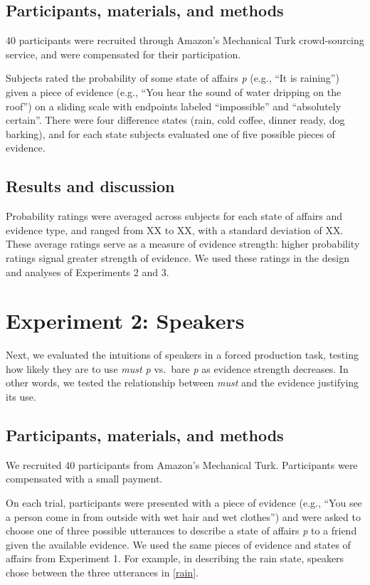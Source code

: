 \documentclass[10pt,letterpaper]{article}
\begin{document}
\subsection{Participants, materials, and methods}

40 participants were recruited through Amazon's Mechanical Turk crowd-sourcing service, and were compensated for their participation.

Subjects rated the probability of some state of affairs \emph{p} (e.g., ``It is raining'') given a piece of evidence (e.g., ``You hear the sound of water dripping on the roof'') on a sliding scale with endpoints labeled ``impossible'' and ``absolutely certain''. There were four difference states (rain, cold coffee, dinner ready, dog barking), and for each state subjects evaluated one of five possible pieces of evidence.

\subsection{Results and discussion}

Probability ratings were averaged across subjects for each state of affairs and evidence type, and ranged from XX to XX, with a standard deviation of XX. These average ratings serve as a measure of evidence strength: higher probability ratings signal greater strength of evidence. We used these ratings in the design and analyses of Experiments 2 and 3.

\section{Experiment 2: Speakers}

Next, we evaluated the intuitions of speakers in a forced production task, testing how likely they are to use \emph{must p} vs.~bare \emph{p} as evidence strength decreases. In other words, we tested the relationship between \emph{must} and the evidence justifying its use.

\subsection{Participants, materials, and methods}

We recruited 40 participants from Amazon's Mechanical Turk. Participants were compensated with a small payment.

On each trial, participants were presented with a piece of evidence (e.g., ``You see a person come in from outside with wet hair and wet clothes'') and were asked to choose one of three possible utterances to describe a state of affairs \emph{p} to a friend given the available evidence. We used the same pieces of evidence and states of affairs from Experiment 1. For example, in describing the rain state, speakers chose between the three utterances in \ref{rain}.
\end{document}
